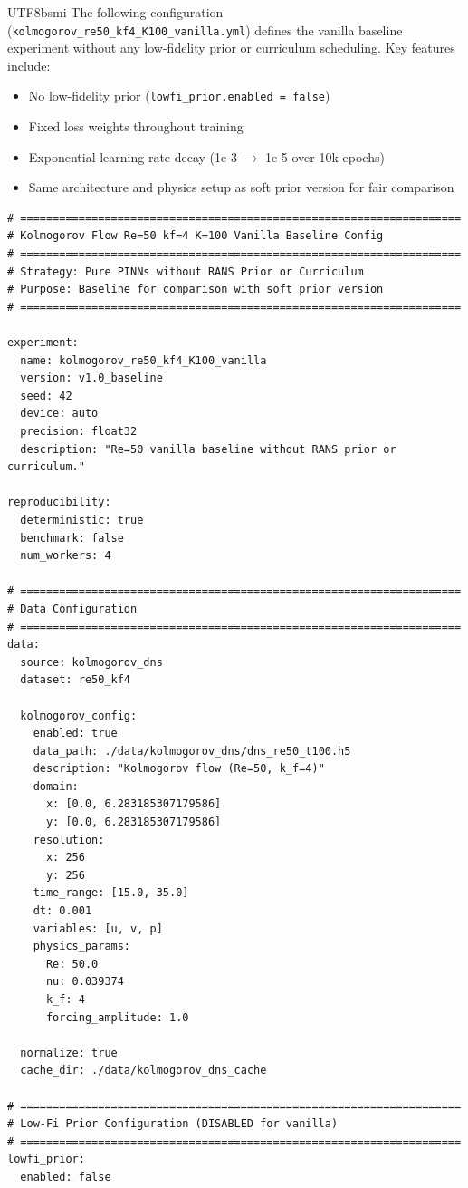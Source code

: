 \documentclass[master]{NTHUthesis}
\begin{document}
\begin{CJK*}{UTF8}{bsmi}
The following configuration (\texttt{kolmogorov\_re50\_kf4\_K100\_vanilla.yml}) defines the vanilla baseline experiment without any low-fidelity prior or curriculum scheduling. Key features include:
\begin{itemize}
    \item No low-fidelity prior (\texttt{lowfi\_prior.enabled = false})
    \item Fixed loss weights throughout training
    \item Exponential learning rate decay (1e-3 $\to$ 1e-5 over 10k epochs)
    \item Same architecture and physics setup as soft prior version for fair comparison
\end{itemize}

\begin{small}
\begin{lstlisting}[style=yamlStyle]
# ====================================================================
# Kolmogorov Flow Re=50 kf=4 K=100 Vanilla Baseline Config
# ====================================================================
# Strategy: Pure PINNs without RANS Prior or Curriculum
# Purpose: Baseline for comparison with soft prior version
# ====================================================================

experiment:
  name: kolmogorov_re50_kf4_K100_vanilla
  version: v1.0_baseline
  seed: 42
  device: auto
  precision: float32
  description: "Re=50 vanilla baseline without RANS prior or curriculum."

reproducibility:
  deterministic: true
  benchmark: false
  num_workers: 4

# ====================================================================
# Data Configuration
# ====================================================================
data:
  source: kolmogorov_dns
  dataset: re50_kf4
  
  kolmogorov_config:
    enabled: true
    data_path: ./data/kolmogorov_dns/dns_re50_t100.h5
    description: "Kolmogorov flow (Re=50, k_f=4)"
    domain:
      x: [0.0, 6.283185307179586]
      y: [0.0, 6.283185307179586]
    resolution:
      x: 256
      y: 256
    time_range: [15.0, 35.0]
    dt: 0.001
    variables: [u, v, p]
    physics_params:
      Re: 50.0
      nu: 0.039374
      k_f: 4
      forcing_amplitude: 1.0
  
  normalize: true
  cache_dir: ./data/kolmogorov_dns_cache

# ====================================================================
# Low-Fi Prior Configuration (DISABLED for vanilla)
# ====================================================================
lowfi_prior:
  enabled: false


\end{lstlisting}
\end{small}
\end{CJK*}
\end{document}
